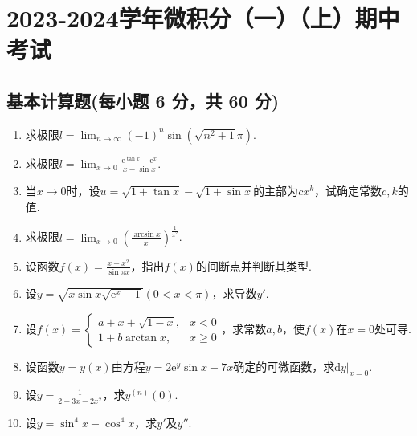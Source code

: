 \documentclass[../Main.tex]{subfiles}
\begin{document}
\chapter{2023-2024学年微积分（一）（上）期中考试}

\section{基本计算题(每小题 6 分，共 60 分)}
\begin{enumerate}
    \item 求极限$l=\lim_{n\to\infty}(-1)^{n}\sin\left(\sqrt{n^{2}+1}\pi\right)$.
          \vspace{11em}

    \item 求极限$l=\lim_{x\to0}\frac{\mathrm{e}^{\tan x}-\mathrm{e}^{x}}{x-\sin
                  x}.$
          \vspace{11em}

    \item 当$x\to 0$时，设$u=\sqrt{1+\tan x}-\sqrt{1+\sin x}$的主部为$cx^{k}$，试确定常数$c
              ,k$的值.
          \vspace{11em}

    \item 求极限$l=\lim_{x\to0}\left(\frac{\arcsin x}{x}\right)^{\frac{1}{x^{2}}}$.
          \vspace{11em}

    \item 设函数$f(x)=\frac{x-x^{2}}{\sin \pi x}$，指出$f(x)$的间断点并判断其类型.
          \vspace{9em}

    \item 设$y=\sqrt{x\sin x\sqrt{\mathrm{e}^{x}-1}}(0<x<\pi)$，求导数$y'$.
          \vspace{10em}

    \item 设$f(x)=
              \begin{cases}
                  a+x+\sqrt{1-x}, & x<0    \\
                  1+b\arctan x,   & x\geq0
              \end{cases}$，求常数$a,b$，使$f(x)$在$x=0$处可导.
          \vspace{10em}

    \item 设函数$y=y(x)$由方程$y=2\mathrm{e}^{y}\sin x-7x$确定的可微函数，求$\left
              .\mathrm{d}y\right|_{x=0}$.
          \vspace{10em}

    \item 设$y=\frac{1}{2-3x-2x^{2}}$，求$y^{(n)}(0)$.
          \vspace{8em}

    \item 设$y=\sin^{4} x-\cos^{4} x$，求$y'$及$y''$.
          \vspace{8em}
\end{enumerate}
\end{document}
